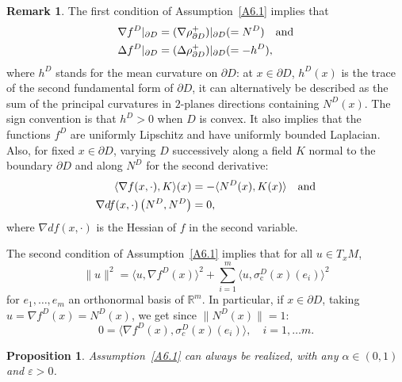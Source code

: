 \documentclass[JEP,XML,SOM,Unicode,NoFloatCountersInSection,published]{cedram}
\theoremstyle{plain}
\newtheorem{prop}[thm]{Proposition}
\theoremstyle{definition}
\newtheorem{remark}[thm]{Remark}
\newcommand{\RR}{{\mathbb R}}
\let\a\alpha
\let\e\varepsilon
\let\n\nabla
\let\s\sigma
\let\pa\partial
\begin{document}
\begin{remark}
The first condition of Assumption~\ref{A6.1} implies that
\begin{equation}
\label{6.2bis}
\begin{split}
\n f^D|_{\partial D}&=({\n \rho^{+}_{\partial D})}|_{\partial D}(=N^{D}) \quad\hbox{and}\\ \Delta f^D|_{\partial D}&=(\Delta {\rho^{+}_{\partial D})}|_{\partial D}(=-h^{D}),
\end{split}
\end{equation}
where $h^D$ stands for the mean curvature on $\pa D$: at $x\in\pa D$, $h^D(x)$ is the trace of the second fundamental form of $\pa D$, it can alternatively be described as the sum of the principal curvatures in $2$-planes directions containing $N^D(x)$. The sign convention is that $h^D>0$ when $D$ is convex.
It also implies that the functions $f^D$ are uniformly Lipschitz and have uniformly bounded Laplacian. Also, for fixed $x\in \partial D$, varying $D$ successively along a field $K$ normal to the boundary $\partial D$ and along $N^{D}$ for the second derivative:
\begin{equation}
\begin{split}
\langle \n f(x, \cdot ), K\rangle(x)&=-\langle N^{D}(x), K(x)\rangle \quad\hbox{and}\\ \n d f (x, \cdot)\left(N^{D},N^{D}\right)&=0,
\end{split}
\end{equation}
where $\n d f (x, \cdot)$ is the Hessian of $f$ in the second variable.

The second condition of Assumption~\ref{A6.1} implies that for all $u\in T_xM$,
\begin{equation}
\|u\|^2=\langle u,\n f^D(x)\rangle^2+ \sum_{i=1}^m\langle u,\s^D_{\mathrm c}(x)(e_i)\rangle^2
\end{equation}
for $e_1,\ldots,e_m$ an orthonormal basis of $\RR^m$. In particular, if $x\in \partial D$, taking $u=\n f^D(x)=N^D(x)$, we get since $\|N^D(x)\|=1$:
\begin{equation}
\label{6.4.2}
0=\langle \n f^D(x),\s_c^D(x)(e_i)\rangle, \quad i=1,\ldots m.
\end{equation}
\end{remark}
\begin{prop}
\label{P6.3}
Assumption~\ref{A6.1} can always be realized, with any $\a\in(0,1)$ and $\e>0$.
\end{prop}
\end{document}
